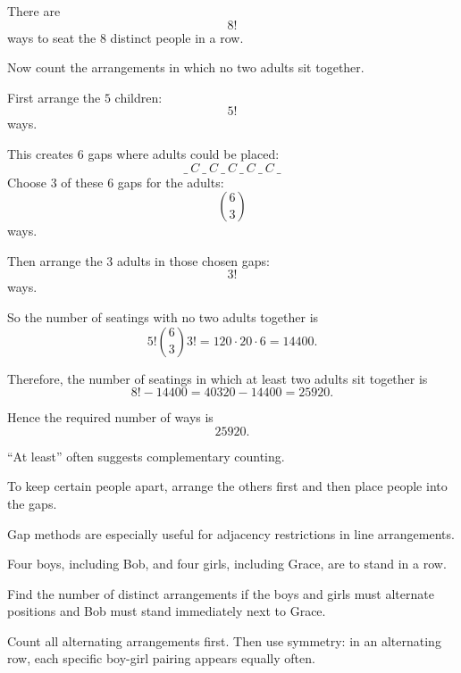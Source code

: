 \begin{solution}
There are
\[
8!
\]
ways to seat the $8$ distinct people in a row.

Now count the arrangements in which no two adults sit together.

First arrange the $5$ children:
\[
5!
\]
ways.

This creates $6$ gaps where adults could be placed:
\[
\_ \ C \ \_ \ C \ \_ \ C \ \_ \ C \ \_ \ C \ \_ 
\]
Choose $3$ of these $6$ gaps for the adults:
\[
\binom{6}{3}
\]
ways.

Then arrange the $3$ adults in those chosen gaps:
\[
3!
\]
ways.

So the number of seatings with no two adults together is
\[
5!\binom{6}{3}3! = 120 \cdot 20 \cdot 6 = 14400.
\]

Therefore, the number of seatings in which at least two adults sit together is
\[
8! - 14400 = 40320 - 14400 = 25920.
\]

Hence the required number of ways is
\[
\boxed{25920}.
\]
\end{solution}

\begin{takeaways}
\item ``At least'' often suggests complementary counting.
\item To keep certain people apart, arrange the others first and then place people into the gaps.
\item Gap methods are especially useful for adjacency restrictions in line arrangements.
\end{takeaways}

\begin{problem}
Four boys, including Bob, and four girls, including Grace, are to stand in a row.

Find the number of distinct arrangements if the boys and girls must alternate positions and Bob must stand immediately next to Grace.
\end{problem}

\begin{hint}
Count all alternating arrangements first. Then use symmetry: in an alternating row, each specific boy-girl pairing appears equally often.
\end{hint}

